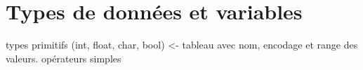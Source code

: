 \chapter{Types de données et variables}

types primitifs (int, float, char, bool) <- tableau avec nom, encodage et range des valeurs.
opérateurs simples